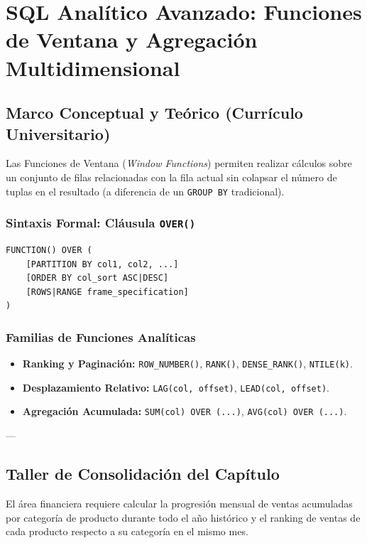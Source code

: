 \chapter{SQL Anal\'itico Avanzado: Funciones de Ventana y Agregaci\'on Multidimensional}
\label{cap:sql_analitico_window_functions}

\section{Marco Conceptual y Te\'orico (Curr\'iculo Universitario)}

Las Funciones de Ventana (\textit{Window Functions}) permiten realizar c\'alculos sobre un conjunto de filas relacionadas con la fila actual sin colapsar el n\'umero de tuplas en el resultado (a diferencia de un \texttt{GROUP BY} tradicional).

\subsection{Sintaxis Formal: Cl\'ausula \texttt{OVER()}}
\begin{lstlisting}[style=sqlstyle]
FUNCTION() OVER (
    [PARTITION BY col1, col2, ...]
    [ORDER BY col_sort ASC|DESC]
    [ROWS|RANGE frame_specification]
)
\end{lstlisting}

\subsection{Familias de Funciones Anal\'iticas}
\begin{itemize}
    \item \textbf{Ranking y Paginaci\'on:} \texttt{ROW\_NUMBER()}, \texttt{RANK()}, \texttt{DENSE\_RANK()}, \texttt{NTILE(k)}.
    \item \textbf{Desplazamiento Relativo:} \texttt{LAG(col, offset)}, \texttt{LEAD(col, offset)}.
    \item \textbf{Agregaci\'on Acumulada:} \texttt{SUM(col) OVER (...)}, \texttt{AVG(col) OVER (...)}.
\end{itemize}

---

\section{Taller de Consolidaci\'on del Cap\'itulo}

\begin{businessproblem}
El \'area financiera requiere calcular la progresi\'on mensual de ventas acumuladas por categor\'ia de producto durante todo el a\~no hist\'orico y el ranking de ventas de cada producto respecto a su categor\'ia en el mismo mes.
\end{businessproblem}

